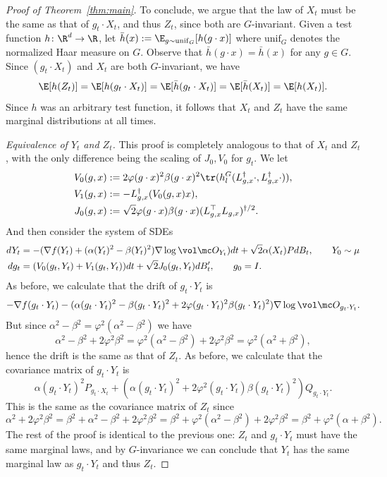 \documentclass[twoside,a4paper,11pt]{article}
\renewcommand{\phi}{\varphi}
\theoremstyle{plain}
\begin{document}
\begin{proof}[Proof of Theorem~\ref{thm:main}]
To conclude, we argue that the law of $X_t$ must be the
same as that of $g_t \cdot X_t$,
and thus $Z_t$, since both are $G$-invariant.
Given a test function $h\colon \R^d \to \R$, let $\bar h(x) := \E_{g \sim \mathrm{unif}_G}[h(g\cdot x)]$
where $\mathrm{unif}_G$ denotes the normalized Haar measure
on $G$. Observe that $\bar h(g\cdot x) = \bar h(x)$ for any $g\in G$.
Since
$(g_t \cdot X_t)$ and $X_t$ are both $G$-invariant, we have
$$
\E[h(Z_t)] = 
\E[h(g_t \cdot X_t)] = \E[\bar h(g_t \cdot X_t)]
= \E[ \bar h(X_t)] = \E[h(X_t)].
$$ Since $h$ was an arbitrary test function, it follows that
$X_t$ and $Z_t$ have the same marginal distributions at all times.

{\it Equivalence of $Y_t$ and $Z_t$.}
This proof is completely
analogous to that of $X_t$ and $Z_t$, with the only
difference being the scaling of $J_0, V_0$
for $g_t$. We let
\begin{align*}
V_0(g, x) &:=2\phi(g\cdot x)^2\beta(g\cdot x)^2 \tr(h_{l}^G(L_{g, x}^{\dagger}
    \cdot, L_{g, x}^{\dagger} \cdot)),\\
    V_1(g, x) &:= -L_{g, x}^{\dagger}(V_0(g, x)x), \\
    J_0(g, x) &:= \sqrt{2} \phi(g\cdot x)\beta(g \cdot x) 
    (L_{g, x}^\top L_{g, x})^{\dagger/2}.
\end{align*}
And then consider the system of SDEs
\begin{align}
dY_t &= -(\nabla f(Y_t) + (\alpha(Y_t)^2
- \beta(Y_t)^2) \nabla \log \vol \mc O_{Y_t})
dt + \sqrt{2}\alpha(X_t) PdB_t, \quad \quad Y_0 \sim \mu \notag \\
    dg_t &= (V_0(g_t, Y_t) + V_1(g_t, Y_t))dt
    + \sqrt{2}J_0(g_t, Y_t)dB_t', \quad \quad g_0 = I.
    \label{eqn:full_gt_dynamics2}
    \end{align}
    As before, we calculate that the drift of $g_t \cdot Y_t$ 
    is
    $$
    -\nabla f(g_t \cdot Y_t)
    - (\alpha(g_t \cdot Y_t)^2 - \beta(g_t \cdot Y_t)^2 + 2\phi(g_t \cdot Y_t)^2 \beta(g_t \cdot Y_t)^2)\nabla \log \vol \mc O_{g_t \cdot Y_t}.
    $$ But since $\alpha^2 - \beta^2 = \phi^2(\alpha^2 - \beta^2)$
    we have
    $$
    \alpha^2 - \beta^2 + 2\phi^2 \beta^2
    = \phi^2 (\alpha^2 - \beta^2) + 2\phi^2 \beta^2
    = \phi^2(\alpha^2 + \beta^2),
    $$ hence the drift is the same as that of $Z_t$.
    As before, we calculate
    that the covariance matrix of $g_t \cdot Y_t$ is
    $$
    \alpha(g_t \cdot Y_t)^2
    P_{g_t \cdot X_t}
    + (\alpha(g_t \cdot Y_t)^2 + 2 \phi^2(g_t \cdot Y_t)
    \beta(g_t \cdot Y_t)^2)Q_{g_t \cdot Y_t}.
    $$ This is the same as the covariance matrix of $Z_t$ since
    $$
    \alpha^2 + 2\phi^2 \beta^2 = 
    \beta^2 + \alpha^2 - \beta^2 + 2\phi^2\beta^2=
    \beta^2 + \phi^2(\alpha^2 - \beta^2) + 2\phi^2\beta^2
    = \beta^2 + \phi^2(\alpha + \beta^2).
    $$ The rest of the proof is identical to the previous one:
    $Z_t$ and $g_t \cdot Y_t$ must have the same
    marginal laws, and by $G$-invariance we can conclude
    that $Y_t$ has the same marginal law as $g_t \cdot Y_t$
    and thus $Z_t$.


\end{proof}
\end{document}
